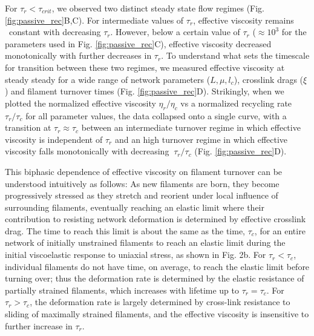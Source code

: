 For $\tau_r < \tau_{crit}$, we observed two distinct steady state flow regimes (Fig. \ref{fig:passive_rec}B,C). For intermediate values of $\tau_r$, effective viscosity remains ~constant with decreasing $\tau_r$.  However, below a certain value of  $\tau_r$ ($\approx 10^3$ for the parameters used in Fig. \ref{fig:passive_rec}C),  effective viscosity decreased monotonically with further decreases in $\tau_r$. To understand what sets the timescale for transition between these two regimes,  we measured effective viscosity at steady steady for a wide range of  network parameters ($L, \mu, {l_c}$), crosslink drags ($\xi$) and filament turnover times (Fig. \ref{fig:passive_rec}D). Strikingly, when we plotted the normalized effective viscosity $\eta_r/\eta_c$ vs a normalized recycling rate $\tau_r/\tau_c$ for all parameter values, the data collapsed onto a single curve, with a transition at  $\tau_r \approx \tau_c$  between an intermediate turnover regime in which effective viscosity is independent of $\tau_r$  and an high turnover regime in which effective viscosity falls monotonically with decreasing $~\tau_r/\tau_c$  (Fig. \ref{fig:passive_rec}D). 

This biphasic dependence of effective viscosity on filament turnover can be understood intuitively as follows:  As new filaments are born, they become progressively stressed as they stretch and reorient under local influence of surrounding filaments, eventually reaching an elastic limit where their contribution to resisting network deformation is determined by effective crosslink drag.  The time to reach this limit is about the same as the time, $\tau_c$, for an entire network of initially unstrained filaments to reach an elastic limit during the initial viscoelastic response to uniaxial stress, as shown in Fig. 2b.  For $\tau_r < \tau_c$, individual filaments do not have time, on average, to reach the elastic limit before turning over; thus the deformation rate is determined by the elastic resistance of partially strained filaments, which increases with lifetime up to $\tau_r = \tau_c$. For $\tau_r > \tau_c$, the deformation rate is largely determined by cross-link resistance to sliding of maximally strained filaments, and the effective viscosity is insensitive to further increase in  $\tau_r$.

